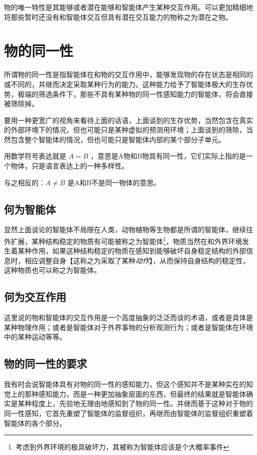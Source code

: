 \documentclass[12pt,oneside]{book}
\begin{document}
物的唯一特性是其能够或者潜在能够和智能体产生某种交互作用。可以更加精细地将那些暂时还没有和智能体交互但具有潜在交互能力的物称之为潜在之物。

\section{物的同一性}
所谓物的同一性是指智能体在和物的交互作用中，能够发现物的存在状态是相同的或不同的，并继而决定采取某种行为的能力。这种能力给予了智能体极大的生存优势，极端的筛选条件下，那些不具有某种物的同一性感知能力的智能体，将会直接被筛除掉。

要用一种更宽广的视角来看待上面的话语，上面谈到的生存优势，当然包含在真实的外部环境下的情况，但也可能只是某种虚拟的预测用环境；上面谈到的筛除，当然包含整个智能体的情况，但也可能只是智能体内部的某个部分子单元。

用数学符号表达就是 $A=B$ ，意思是A物和B物具有同一性，它们实际上指的是一个物体，只是语言表达上的一种多样性。

与之相反的：$A \neq B$ 是A和B不是同一物体的意思。


\subsection{何为智能体}
显然上面谈论的智能体不局限在人类，动物植物等生物都是所谓的智能体，继续往外扩展，某种结构稳定的物质有可能被称之为智能体\footnote{考虑到外界环境的极具破坏力，其被称为智能体应该是个大概率事件}，物质当然在和外界环境发生着某种作用，如果这种结构稳定的物质在感知到能够破坏自身稳定结构的外部信息时，相应调整自身【这称之为采取了某种\emph{动作}】，从而保持自身结构的稳定性，这种物质也可以称之为智能体。


\subsection{何为交互作用}
这里说的物和智能体的交互作用是一个高度抽象的泛泛而谈的术语，或者是具体是某种物理作用；或者是智能体对于外界事物的分析观测行为；或者是智能体在环境中的某种运动等等。


\subsection{物的同一性的要求}
我有时会说智能体具有对物的同一性的感知能力，但这个感知并不是某种实在的知觉上的那种感知能力，而是一种更加抽象层面的东西，但最终的结果就是智能体确实是某种程度上，先验地无理由地感知到了物的同一性。并继而基于这种对于物的同一性感知，它首先重塑了智能体的监督组织，再继而由智能体的监督组织重塑着智能体的各个部分。
\end{document}
